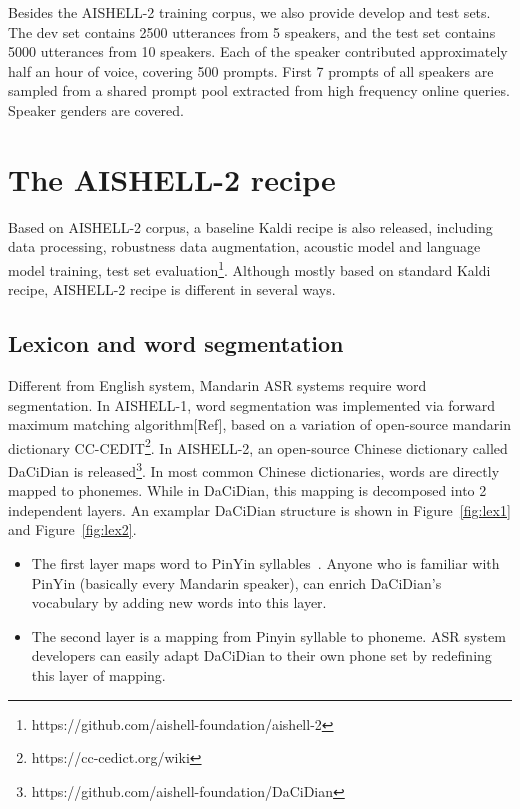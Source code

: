 \documentclass[a4paper]{article}
\begin{document}
Besides the AISHELL-2 training corpus, we also provide develop and test
sets. The dev set contains 2500 utterances from 5 speakers, and the test set
contains 5000 utterances from 10 speakers. Each of the speaker contributed
approximately half an hour of voice, covering 500 prompts. First 7 prompts of
all speakers are sampled from a shared prompt pool extracted from high frequency
online queries. Speaker genders are covered.

\section{The AISHELL-2 recipe}

Based on AISHELL-2 corpus, a baseline Kaldi recipe is also released, including
data processing, robustness data augmentation, acoustic model and language model
training, test set
evaluation\footnote{https://github.com/aishell-foundation/aishell-2}. Although
mostly based on standard Kaldi recipe, AISHELL-2 recipe is different in several
ways.

\subsection{Lexicon and word segmentation}

Different from English system, Mandarin ASR systems require word
segmentation. In AISHELL-1, word segmentation was implemented via forward
maximum matching algorithm[Ref], based on a variation of open-source mandarin
dictionary CC-CEDIT\footnote{https://cc-cedict.org/wiki}. In AISHELL-2, an
open-source Chinese dictionary called DaCiDian is
released\footnote{https://github.com/aishell-foundation/DaCiDian}. In most
common Chinese dictionaries, words are directly mapped to phonemes. While in
DaCiDian, this mapping is decomposed into 2 independent layers. An examplar
DaCiDian structure is shown in Figure~\ref{fig:lex1} and Figure~\ref{fig:lex2}.

\begin{itemize}
\item The first layer maps word to PinYin syllables~\cite{pinyin}. Anyone who is
  familiar with PinYin (basically every Mandarin speaker), can enrich DaCiDian's
  vocabulary by adding new words into this layer.
\item The second layer is a mapping from Pinyin syllable to phoneme. ASR system
  developers can easily adapt DaCiDian to their own phone set by redefining this
  layer of mapping.
\end{itemize}
\end{document}
